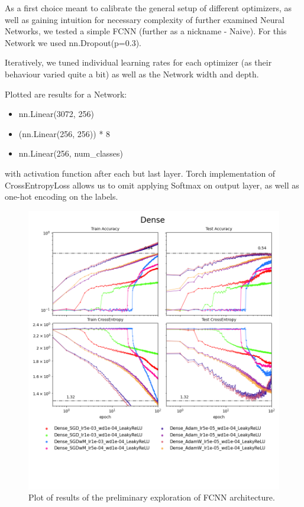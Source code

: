 \documentclass[12pt,a4paper]{article}
\begin{document}
As a first choice meant to calibrate the general setup of
different optimizers, as well as gaining intuition for necessary
complexity of further examined Neural Networks, we tested a simple
FCNN (further as a nickname - Naive). For this Network we used
nn.Dropout(p=0.3).

Iteratively, we tuned individual learning rates for each optimizer
(as their behaviour varied quite a bit) as well as the Network
width and depth. 

Plotted are results for a Network:
\begin{itemize}
  \item nn.Linear(3072, 256)
  \item (nn.Linear(256, 256)) * 8
  \item nn.Linear(256, num\_classes)
\end{itemize}
with activation function after each but last layer. Torch
implementation of CrossEntropyLoss allows us to omit applying
Softmax on output layer, as well as one-hot encoding on the
labels.

\begin{figure}[H]
  \includegraphics[width=\textwidth, trim={0, 3.5cm, 0, 0}, clip]{../logsDense.png}
  \caption{Plot of results of the preliminary exploration of FCNN
  architecture.}
\end{figure}
\end{document}
